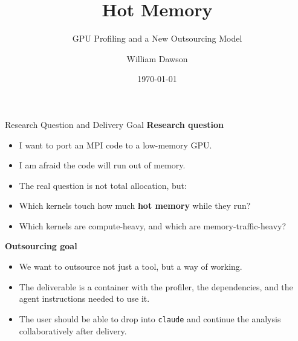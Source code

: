 \documentclass[aspectratio=169]{beamer}
\title{Hot Memory}
\subtitle{GPU Profiling and a New Outsourcing Model}
\author{William Dawson}
\date{\today}
\begin{document}
\begin{frame}
  \titlepage
\end{frame}

\begin{frame}{Research Question and Delivery Goal}
  \textbf{Research question}
  \begin{itemize}
    \item I want to port an MPI code to a low-memory GPU.
    \item I am afraid the code will run out of memory.
    \item The real question is not total allocation, but:
    \item \hspace{1em} Which kernels touch how much \textbf{hot memory} while they run?
    \item \hspace{1em} Which kernels are compute-heavy, and which are memory-traffic-heavy?
  \end{itemize}

  \vspace{0.5em}
  \textbf{Outsourcing goal}
  \begin{itemize}
    \item We want to outsource not just a tool, but a way of working.
    \item The deliverable is a container with the profiler, the dependencies,
          and the agent instructions needed to use it.
    \item The user should be able to drop into \texttt{claude} and continue
          the analysis collaboratively after delivery.
  \end{itemize}
\end{frame}
\end{document}
